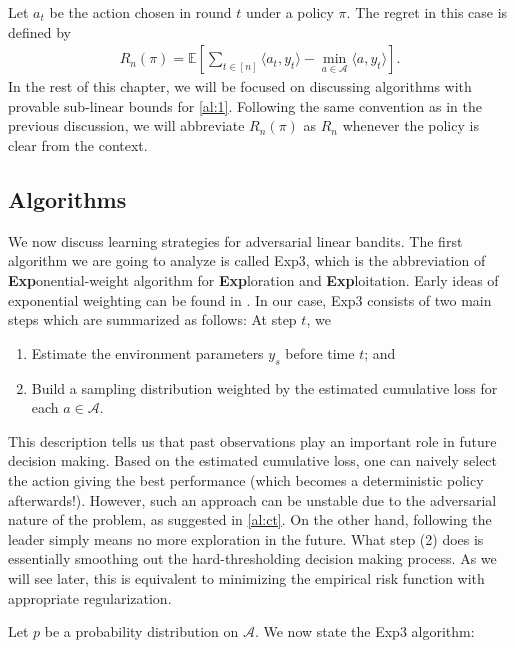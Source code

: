 \documentclass[10pt,a4article]{article}
\numberwithin{equation}{section}
\theoremstyle{plain}
\theoremstyle{definition}
\def\E{{\mathbb E}}
\begin{document}
Let $a_t$ be the action chosen in round $t$ under a policy $\pi$. The regret in this case is defined by 
\begin{align}
R_n(\pi) = \E\left[\sum_{t\in [n]}\langle a_t, y_t\rangle-\min_{a\in\mathcal A}\langle a, y_t\rangle\right].\label{al:1}
\end{align}
In the rest of this chapter, we will be focused on discussing algorithms with provable sub-linear bounds for \eqref{al:1}. Following the same convention as in the previous discussion, we will abbreviate $R_n(\pi)$ as $R_n$ whenever the policy is clear from the context. 


\subsection{Algorithms}

We now discuss learning strategies for adversarial linear bandits.
The first algorithm we are going to analyze is called Exp3, which is the abbreviation of \textbf{Exp}onential-weight algorithm for \textbf{Exp}loration and \textbf{Exp}loitation. 
Early ideas of exponential weighting can be found in \cite{Littlestone_1989, Vovk_1990}.
In our case, Exp3 consists of two main steps which are summarized as follows: At step $t$, we
\begin{enumerate}
\item Estimate the environment parameters $y_s$ before time $t$; and 
\item Build a sampling distribution weighted by the estimated cumulative loss for each $a\in\mathcal A$. 
\end{enumerate}
This description tells us that past observations play an important role in future decision making. Based on the estimated cumulative loss, one can naively select the action giving the best performance (which becomes a deterministic policy afterwards!). However, such an approach can be unstable due to the adversarial nature of the problem, as suggested in \eqref{al:ct}. On the other hand, following the leader simply means no more exploration in the future. What step (2) does is essentially smoothing out the hard-thresholding decision making process. As we will see later, this is equivalent to minimizing the empirical risk function with appropriate regularization.  

Let $p$ be a probability distribution on $\mathcal A$. We now state the Exp3 algorithm:
\end{document}
